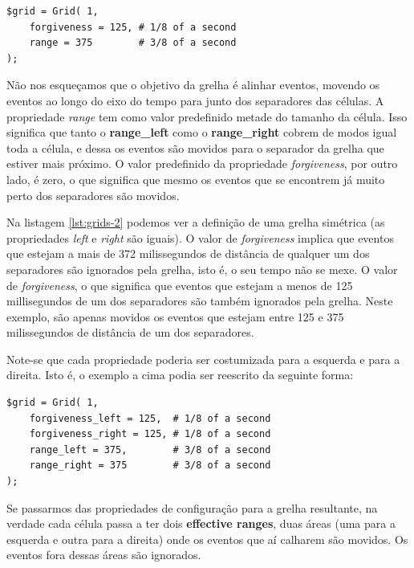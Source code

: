 \begin{lstlisting}[caption={Código de definição da grelha representada na figura \ref{fig:grids-2}},label={lst:grids-2}]
$grid = Grid( 1,
    forgiveness = 125, # 1/8 of a second
    range = 375        # 3/8 of a second
);
\end{lstlisting}

Não nos esqueçamos que o objetivo da grelha é alinhar eventos, movendo os eventos ao longo do eixo do tempo para junto dos separadores das células. A propriedade \textit{range} tem como valor predefinido metade do tamanho da célula. Isso significa que tanto o \textbf{range\_left} como o \textbf{range\_right} cobrem de modos igual toda a célula, e dessa os eventos são movidos para o separador da grelha que estiver mais próximo. O valor predefinido da propriedade \textit{forgiveness}, por outro lado, é zero, o que significa que mesmo os eventos que se encontrem já muito perto dos separadores são movidos.

Na listagem \ref{lst:grids-2} podemos ver a definição de uma grelha simétrica (as propriedades \textit{left} e \textit{right} são iguais). O valor de \textit{forgiveness} implica que eventos que estejam a mais de 372 milissegundos de distância de qualquer um dos separadores são ignorados pela grelha, isto é, o seu tempo não se mexe. O valor de \textit{forgiveness}, o que significa que eventos que estejam a menos de 125 millisegundos de um dos separadores são também ignorados pela grelha. Neste exemplo, são apenas movidos os eventos que estejam entre 125 e 375 milissegundos de distância de um dos separadores.

Note-se que cada propriedade poderia ser costumizada para a esquerda e para a direita. Isto é, o exemplo a cima podia ser reescrito da seguinte forma:

\begin{lstlisting}[caption={Código alternativo de definição da grelha representada na figura \ref{fig:grids-2}, com as propriedades \textit{left} e \textit{right}},label={lst:grids-3}]
$grid = Grid( 1,
    forgiveness_left = 125,  # 1/8 of a second
    forgiveness_right = 125, # 1/8 of a second
    range_left = 375,        # 3/8 of a second
    range_right = 375        # 3/8 of a second
);
\end{lstlisting}

Se passarmos das propriedades de configuração para a grelha resultante, na verdade cada célula passa a ter dois \textbf{effective ranges}, duas áreas (uma para a esquerda e outra para a direita) onde os eventos que aí calharem são movidos. Os eventos fora dessas áreas são ignorados.

